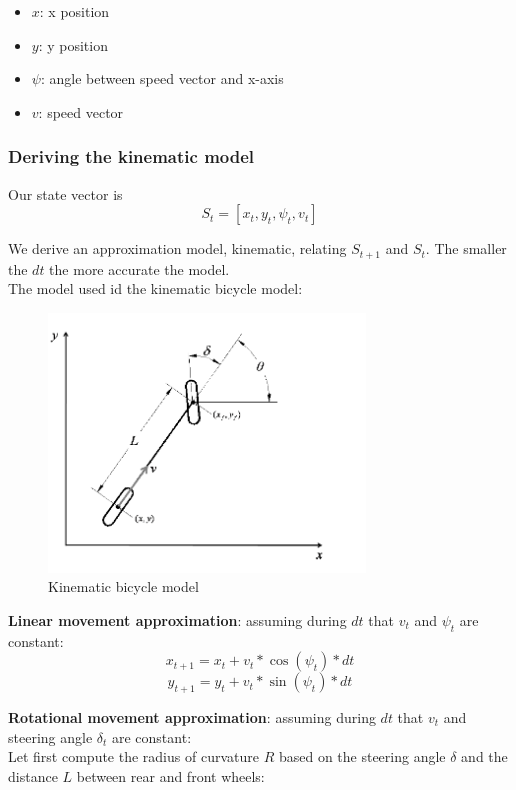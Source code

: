 \documentclass[11pt]{article}
\begin{document}
\begin{itemize}
\item $x$: x position
\item $y$: y position
\item $\psi$: angle between speed vector and x-axis
\item $v$: speed vector
\end{itemize}

\subsubsection{Deriving the kinematic model}


Our state vector is $$ S_t = [x_t, y_t, \psi_t, v_t] $$

We derive an approximation model, kinematic, relating $S_{t+1}$ and $S_t$. The smaller the $dt$ the more accurate the model. \\

The model used id the kinematic bicycle model:

\begin{figure}[h]
    \centering
    \includegraphics[width=0.75\textwidth]{bicycle_model}
    \caption{Kinematic bicycle model}
    \label{fig:bicycle_model}
\end{figure}
\FloatBarrier


\textbf{Linear movement approximation}: assuming during $dt$ that $v_t$ and $\psi_t$ are constant:
$$ x_{t+1} = x_t + v_t * \cos(\psi_t) *  dt $$
$$ y_{t+1} = y_t + v_t * \sin(\psi_t) *  dt $$

\textbf{Rotational movement approximation}: assuming during $dt$ that $v_t$ and steering angle $\delta_t$ are constant: \\

Let first compute the radius of curvature $R$ based on the steering angle $\delta$ and the distance $L$ between rear and front wheels:
\end{document}
